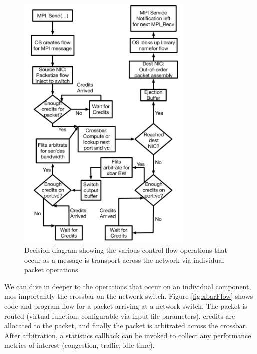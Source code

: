 \begin{figure}
\centering
\includegraphics[width=0.75\textwidth]{figures/DecisionFlow}
\caption{Decision diagram showing the various control flow operations that occur as a message is transport across the network via individual packet operations.}
\label{fig:controlFlow}
\end{figure}

We can dive in deeper to the operations that occur on an individual component, mos importantly the crossbar on the network switch. Figure \ref{fig:xbarFlow} shows code and program flow for a packet arriving at a network switch.  The packet is routed (virtual function, configurable via input file parameters), credits are allocated to the packet, and finally the packet is arbitrated across the crossbar. After arbitration, a statistics callback can be invoked to collect any performance metrics of interest (congestion, traffic, idle time).

